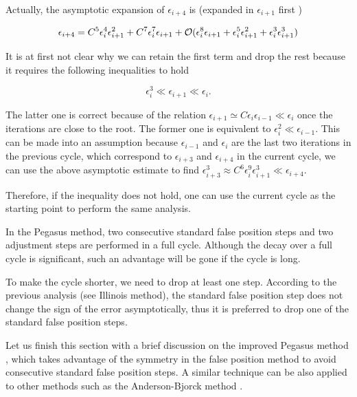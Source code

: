 \begin{remark}
\label{REM: 0-CO-PE-AS}
Actually, the asymptotic expansion of $\epsilon_{i+4}$ is (expanded in $\epsilon_{i+1}$ first )

$$
\epsilon_{i+4} = C^5 \epsilon_{i}^4\epsilon_{i+1}^2 + C^7 \epsilon_i^7\epsilon_{i+1}
+ \mathcal O(\epsilon_{i}^8 \epsilon_{i+1} + \epsilon_{i}^5 \epsilon_{i+1}^2 + \epsilon_{i}^3 \epsilon_{i+1}^3)$$

It is at first not clear why we can retain the first term and drop the rest because it requires the following inequalities to hold

$$\epsilon_{i}^3 \ll \epsilon_{i+1}\ll \epsilon_i.$$

The latter one is correct because of the relation $\epsilon_{i+1} \simeq C \epsilon_{i}\epsilon_{i-1} \ll \epsilon_i$ once the iterations are close to the root. The former one is equivalent to $\epsilon_{i}^2 \ll \epsilon_{i-1}$. This can be made into an assumption because $\epsilon_{i-1}$ and $\epsilon_{i}$ are the last two iterations in the previous cycle, which correspond to $\epsilon_{i+3}$ and $\epsilon_{i+4}$ in the current cycle, we can use the above asymptotic estimate to find $\epsilon_{i+3}^3 \approx C^6 \epsilon_{i}^9 \epsilon_{i+1}^3 \ll \epsilon_{i+4}$. 

Therefore, if the inequality does not hold, one can use the current cycle as the starting point to perform the same analysis.
\end{remark}

In the Pegasus method, two consecutive standard false position steps and two adjustment steps are performed in a full cycle. Although the decay over a full cycle is significant, such an advantage will be gone if the cycle is long.

To make the cycle shorter, we need to drop at least one step. According to the previous analysis (see Illinois method), the standard false position step does not change the sign of the error asymptotically, thus it is preferred to drop one of the standard false position steps.

Let us finish this section with a brief discussion on the improved Pegasus method \cite{king1973improved}, which takes advantage of the symmetry in the false position method to avoid consecutive standard false position steps. A similar technique can be also applied to other methods such as the Anderson-Bjorck method \cite{anderson1973new}.

